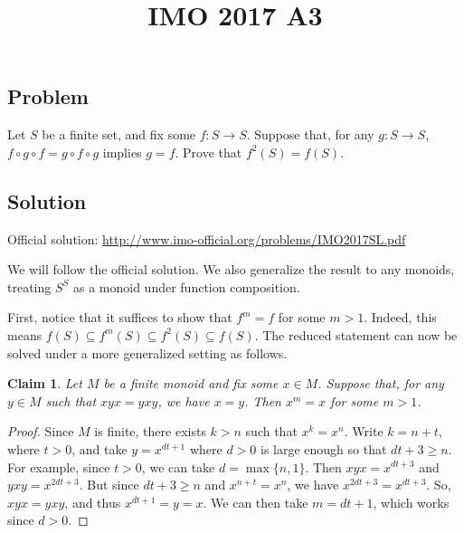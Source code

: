 \documentclass{article}
\title{IMO 2017 A3}
\author{}
\date{}
\newtheorem*{claim}{Claim}
\begin{document}
\maketitle



\subsection*{Problem}

Let $S$ be a finite set, and fix some $f : S \to S$.
Suppose that, for any $g : S \to S$, $f \circ g \circ f = g \circ f \circ g$ implies $g = f$.
Prove that $f^2(S) = f(S)$.



\subsection*{Solution}

Official solution: \url{http://www.imo-official.org/problems/IMO2017SL.pdf}

We will follow the official solution.
We also generalize the result to any monoids, treating $S^S$ as a monoid under function composition.

First, notice that it suffices to show that $f^m = f$ for some $m > 1$.
Indeed, this means $f(S) \subseteq f^m(S) \subseteq f^2(S) \subseteq f(S)$.
The reduced statement can now be solved under a more generalized setting as follows.

\begin{claim}
Let $M$ be a finite monoid and fix some $x \in M$.
Suppose that, for any $y \in M$ such that $xyx = yxy$, we have $x = y$.
Then $x^m = x$ for some $m > 1$.
\end{claim}
\begin{proof}
Since $M$ is finite, there exists $k > n$ such that $x^k = x^n$.
Write $k = n + t$, where $t > 0$, and take $y = x^{dt + 1}$ where $d > 0$ is large enough so that $dt + 3 \geq n$.
For example, since $t > 0$, we can take $d = \max\{n, 1\}$.
Then $xyx = x^{dt + 3}$ and $yxy = x^{2dt + 3}$.
But since $dt + 3 \geq n$ and $x^{n + t} = x^n$, we have $x^{2dt + 3} = x^{dt + 3}$.
So, $xyx = yxy$, and thus $x^{dt + 1} = y = x$.
We can then take $m = dt + 1$, which works since $d > 0$.
\end{proof}
\end{document}
